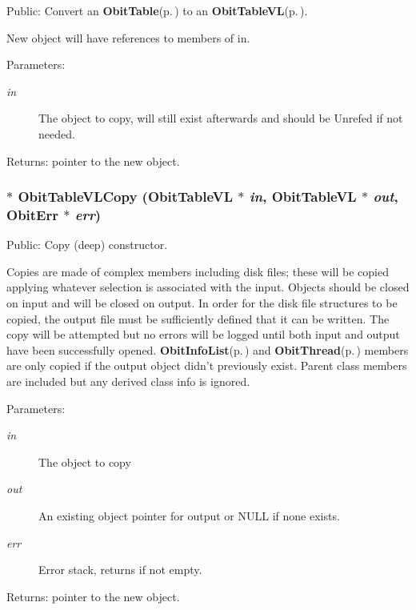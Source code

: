 Public: Convert an {\bf Obit\-Table}{\rm (p.\,\pageref{structObitTable})} to an {\bf Obit\-Table\-VL}{\rm (p.\,\pageref{structObitTableVL})}. 

New object will have references to members of in. \begin{Desc}
\item[Parameters:]
\begin{description}
\item[{\em in}]The object to copy, will still exist afterwards and should be Unrefed if not needed. \end{description}
\end{Desc}
\begin{Desc}
\item[Returns:]pointer to the new object. \end{Desc}
\subsubsection{$\ast$ Obit\-Table\-VLCopy ({\bf Obit\-Table\-VL} $\ast$ {\em in}, {\bf Obit\-Table\-VL} $\ast$ {\em out}, {\bf Obit\-Err} $\ast$ {\em err})}\label{ObitTableVL_8h_a14}


Public: Copy (deep) constructor. 

Copies are made of complex members including disk files; these will be copied applying whatever selection is associated with the input. Objects should be closed on input and will be closed on output. In order for the disk file structures to be copied, the output file must be sufficiently defined that it can be written. The copy will be attempted but no errors will be logged until both input and output have been successfully opened. {\bf Obit\-Info\-List}{\rm (p.\,\pageref{structObitInfoList})} and {\bf Obit\-Thread}{\rm (p.\,\pageref{structObitThread})} members are only copied if the output object didn't previously exist. Parent class members are included but any derived class info is ignored. \begin{Desc}
\item[Parameters:]
\begin{description}
\item[{\em in}]The object to copy \item[{\em out}]An existing object pointer for output or NULL if none exists. \item[{\em err}]Error stack, returns if not empty. \end{description}
\end{Desc}
\begin{Desc}
\item[Returns:]pointer to the new object. \end{Desc}
